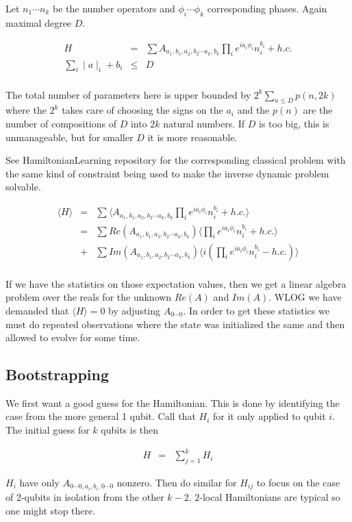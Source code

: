 \documentclass[11pt]{article}
\theoremstyle{change}
\theoremstyle{nonumberplain}
\numberwithin{equation}{section}
\newcommand\abs[1]{ \mid #1 \mid }
\begin{document}
Let $n_1 \cdots n_k$ be the number operators and $\phi_i \cdots \phi_k$ corresponding phases. Again maximal degree $D$.

\begin{eqnarray*}
H &=& \sum A_{a_1,b_1,a_2,b_2 \cdots a_k , b_k} \prod_i e^{i a_i \phi_i} n_i^{b_i} + h.c.\\
\sum_i \abs{a}_i + b_i &\leq& D\\
\end{eqnarray*}

The total number of parameters here is upper bounded by $2^{k} \sum_{n \leq D} p(n,2k)$ where the $2^k$ takes care of choosing the signs on the $a_i$ and the $p(n)$ are the number of compositions of $D$ into $2k$ natural numbers. If $D$ is too big, this is unmanageable, but for smaller $D$ it is more reasonable.

See HamiltonianLearning repository for the corresponding classical problem with the same kind of constraint being used to make the inverse dynamic problem solvable.

\begin{eqnarray*}
\langle H \rangle &=& \sum \langle A_{a_1,b_1,a_2,b_2 \cdots a_k , b_k} \prod_i e^{i a_i \phi_i} n_i^{b_i} + h.c. \rangle\\
&=& \sum Re(A_{a_1,b_1,a_2,b_2 \cdots a_k , b_k}) \langle \prod_i e^{i a_i \phi_i} n_i^{b_i} + h.c. \rangle\\
&+& \sum Im(A_{a_1,b_1,a_2,b_2 \cdots a_k , b_k}) \langle i( \prod_i e^{i a_i \phi_i} n_i^{b_i} - h.c.) \rangle\\
\end{eqnarray*}

If we have the statistics on those expectation values, then we get a linear algebra problem over the reals for the unknown $Re(A)$ and $Im(A)$. WLOG we have demanded that $\langle H \rangle = 0$ by adjusting $A_{0 \cdots 0}$. In order to get these statistics we must do repeated observations where the state was initialized the same and then allowed to evolve for some time.

\subsection{Bootstrapping}

We first want a good guess for the Hamiltonian. This is done by identifying the case from the more general 1 qubit. Call that $H_{i}$ for it only applied to qubit $i$. The initial guess for $k$ qubits is then

\begin{eqnarray*}
H &=& \sum_{j=1}^k H_i
\end{eqnarray*}

$H_i$ have only $A_{0 \cdots 0, a_i , b_i, 0 \cdots 0}$ nonzero. Then do similar for $H_{ij}$ to focus on the case of $2$-qubits in isolation from the other $k-2$. $2$-local Hamiltonians are typical so one might stop there.
\end{document}
